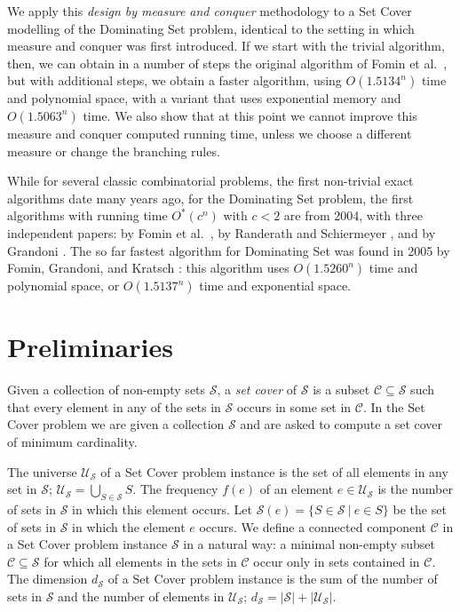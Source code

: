 \documentclass[fleqn]{stacs_proc}
\begin{document}
We apply this {\em design by measure and conquer} methodology to a {\sc Set Cover}
modelling of the {\sc Dominating Set} problem, identical to the setting in which
measure and conquer was first introduced.
If we start with the trivial algorithm, then, we can obtain in a number of steps the original
algorithm of Fomin et al.~\cite{FominGK05a}, but with additional steps, we obtain a faster
algorithm, using $O(1.5134^n)$ time and polynomial space, with a variant that uses exponential
memory and $O(1.5063^n)$ time. We also show that at this point we cannot improve this
measure and conquer computed running time, unless we choose a different measure
or change the branching rules.

While for several classic combinatorial problems, the first non-trivial exact algorithms date many years
ago, for the {\sc Dominating Set} problem, the first algorithms with running time 
$O^\ast(c^n)$ with $c<2$ are from 2004, with three independent papers: by Fomin et
al.~\cite{FominKW04}, by Randerath and Schiermeyer \cite{RanderathS05}, and by
Grandoni \cite{Grandoni06}. The so far fastest algorithm for {\sc Dominating Set} was
found in 2005 by Fomin, Grandoni, and Kratsch \cite{FominGK05a}: this algorithm uses 
$O(1.5260^n)$ time and polynomial space, or $O(1.5137^n)$ time and exponential space.






\section{Preliminaries} \label{sec:definitions}
Given a collection of non-empty sets $\mathcal{S}$,
a \emph{set cover} of $\mathcal{S}$ is a subset
$\mathcal{C} \subseteq \mathcal{S}$ such that every element in any of the sets in $\mathcal{S}$ occurs in some set in $\mathcal{C}$.
In the {\sc Set Cover} problem we are given a collection $\mathcal{S}$
and are asked to compute a set cover of minimum cardinality.

The universe $\mathcal{U_S}$ of a {\sc Set Cover}
problem instance is the set of all elements in any set in $\mathcal{S}$; $\mathcal{U_S} = \bigcup_{S \in \mathcal{S}} S$.
The frequency $f(e)$ of an element $e \in \mathcal{U_S}$ is the number of sets in $\mathcal{S}$ in which this element occurs.
Let $\mathcal{S}(e) = \{ S \in \mathcal{S} ~|~ e \in S \}$ be the set of sets in $\mathcal{S}$ in which the element $e$ occurs.
We define a connected component $\mathcal{C}$ in a {\sc Set Cover} problem instance $\mathcal{S}$ in a natural way:
a minimal non-empty subset $\mathcal{C}\subseteq\mathcal{S}$ for which all elements in the sets in $\mathcal{C}$
occur only in sets contained in $\mathcal{C}$.
The dimension $d_\mathcal{S}$ of a {\sc Set Cover} problem instance is the sum
of the number of sets in $\mathcal{S}$ and the number of elements in $\mathcal{U_S}$; $d_\mathcal{S} = |\mathcal{S}| + |\mathcal{U_S}|$.
\end{document}
